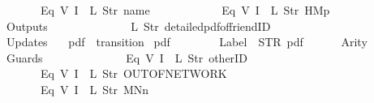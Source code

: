 \begin{isabellebody}
\ \ \ \ \ \ \ \ \ \ \ \ Eq\ {\isacharparenleft}V\ {\isacharparenleft}I\ {}{\isacharparenright}{\isacharparenright}\ {\isacharparenleft}L\ {\isacharparenleft}Str\ {\isacharprime}{\isacharprime}name{\isacharprime}{\isacharprime}{\isacharparenright}{\isacharparenright}{\isacharcomma}\isanewline
\ \ \ \ \ \ \ \ \ \ \ \ Eq\ {\isacharparenleft}V\ {\isacharparenleft}I\ {}{\isacharparenright}{\isacharparenright}\ {\isacharparenleft}L\ {\isacharparenleft}Str\ {\isacharprime}{\isacharprime}HM{}p{\isacharprime}{\isacharprime}{\isacharparenright}{\isacharparenright}\isanewline
\ \ \ \ \ \ {\isacharbrackright}{\isacharcomma}\isanewline
\ \ \ \ \ \ Outputs\ {\isacharequal}\ {\isacharbrackleft}\isanewline
\ \ \ \ \ \ \ \ \ \ \ \ {\isacharparenleft}L\ {\isacharparenleft}Str\ {\isacharprime}{\isacharprime}detailed{\isacharunderscore}pdf{\isacharunderscore}of{\isacharunderscore}friendID{\isacharprime}{\isacharprime}{\isacharparenright}{\isacharparenright}\isanewline
\ \ \ \ \ \ {\isacharbrackright}{\isacharcomma}\isanewline
\ \ \ \ \ \ Updates\ {\isacharequal}\ {\isacharbrackleft}{\isacharbrackright}\isanewline
{\isasymrparr}{\isachardoublequoteclose}\isanewline
\isanewline
{}\isamarkupfalse%
\ {\isachardoublequoteopen}pdf{}{\isachardoublequoteclose}\ {\isacharcolon}{\isacharcolon}\ {\isachardoublequoteopen}transition{\isachardoublequoteclose}\ \isanewline
{\isachardoublequoteopen}pdf{}\ {\isasymequiv}\ {\isasymlparr}\isanewline
\ \ \ \ \ \ Label\ {\isacharequal}\ STR\ {\isacharprime}{\isacharprime}pdf{\isacharprime}{\isacharprime}{\isacharcomma}\isanewline
\ \ \ \ \ \ Arity\ {\isacharequal}\ {}{\isacharcomma}\isanewline
\ \ \ \ \ \ Guards\ {\isacharequal}\ {\isacharbrackleft}\isanewline
\ \ \ \ \ \ \ \ \ \ \ \ Eq\ {\isacharparenleft}V\ {\isacharparenleft}I\ {}{\isacharparenright}{\isacharparenright}\ {\isacharparenleft}L\ {\isacharparenleft}Str\ {\isacharprime}{\isacharprime}otherID{\isacharprime}{\isacharprime}{\isacharparenright}{\isacharparenright}{\isacharcomma}\isanewline
\ \ \ \ \ \ \ \ \ \ \ \ Eq\ {\isacharparenleft}V\ {\isacharparenleft}I\ {}{\isacharparenright}{\isacharparenright}\ {\isacharparenleft}L\ {\isacharparenleft}Str\ {\isacharprime}{\isacharprime}OUT{\isacharunderscore}OF{\isacharunderscore}NETWORK{\isacharprime}{\isacharprime}{\isacharparenright}{\isacharparenright}{\isacharcomma}\isanewline
\ \ \ \ \ \ \ \ \ \ \ \ Eq\ {\isacharparenleft}V\ {\isacharparenleft}I\ {}{\isacharparenright}{\isacharparenright}\ {\isacharparenleft}L\ {\isacharparenleft}Str\ {\isacharprime}{\isacharprime}MNn{}{\isacharprime}{\isacharprime}{\isacharparenright}{\isacharparenright}\isanewline

\end{isabellebody}
